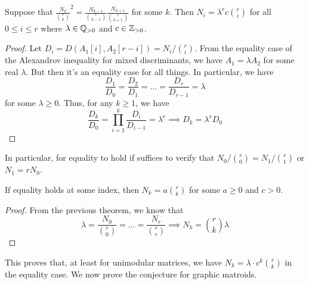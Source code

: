 \documentclass[12pt]{article}
\begin{document}
\begin{thm}
	Suppose that $\frac{N_k}{\binom{r}{k}}^2 = \frac{N_{k-1}}{\binom{r}{k-1}} \frac{N_{k+1}}{\binom{r}{k+1}}$ for some $k$. Then $N_i = \lambda^r c \binom{r}{i}$ for all $0 \leq i \leq r$ where $\lambda \in \mathbb{Q}_{> 0}$ and $c \in \mathbb{Z}_{> 0}$. 
\end{thm}

\begin{proof}
	Let $D_i = D(A_1[i], A_2 [r-i]) = N_i / \binom{r}{i}$. From the equality case of the Alexandrov inequality for mixed discriminants, we have $A_1 = \lambda A_2$ for some real $\lambda$. But then it's an equality case for all things. In particular, we have 
	\[
		\frac{D_1}{D_0} = \frac{D_2}{D_1} = \ldots = \frac{D_r}{D_{r-1}} = \lambda
	\]
	for some $\lambda \geq 0$. Thus, for any $k \geq 1$, we have 
	\[
		\frac{D_k}{D_0} = \prod_{i = 1}^k \frac{D_{i}}{D_{i-1}} = \lambda^r \implies D_k = \lambda^r D_0
	\]
\end{proof}

In particular, for equality to hold if suffices to verify that $N_0 / \binom{r}{0} = N_1 / \binom{r}{1}$ or $N_1 = r N_0$. 

\begin{thm}
	If equality holds at some index, then $N_k = a\binom{r}{k}$ for some $ a \geq 0$ and $c > 0$. 
\end{thm}

\begin{proof}
	From the previous theorem, we know that 
	\[
		\lambda = \frac{N_0}{\binom{r}{0}} = \ldots = \frac{N_r}{\binom{r}{r}} \implies N_k = \binom{r}{k} \lambda 
	\]
\end{proof}
This proves that, at least for unimodular matrices, we have $N_k = \lambda \cdot c^k \binom{r}{k}$ in the equality case. We now prove the conjecture for graphic matroids. 
\end{document}
